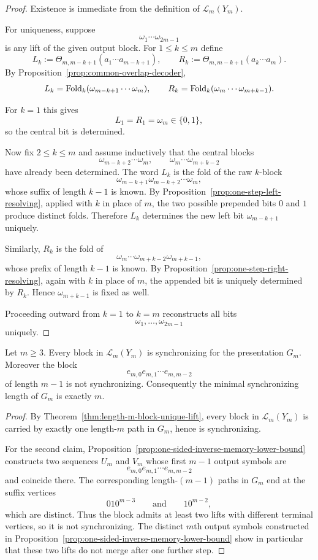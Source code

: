 \begin{proof}
Existence is immediate from the definition of $\mathcal L_m(Y_m)$.

For uniqueness, suppose
\[
\omega_1\cdots\omega_{2m-1}
\]
is any lift of the given output block.  For $1\le k\le m$ define
\[
L_k:=\Theta_{m,m-k+1}(a_1\cdots a_{m-k+1}),
\qquad
R_k:=\Theta_{m,m-k+1}(a_k\cdots a_m).
\]
By Proposition~\ref{prop:common-overlap-decoder},
\[
L_k=\operatorname{Fold}_k(\omega_{m-k+1}\cdots\omega_m),
\qquad
R_k=\operatorname{Fold}_k(\omega_m\cdots\omega_{m+k-1}).
\]

For $k=1$ this gives
\[
L_1=R_1=\omega_m\in\{0,1\},
\]
so the central bit is determined.

Now fix $2\le k\le m$ and assume inductively that the central blocks
\[
\omega_{m-k+2}\cdots\omega_m,
\qquad
\omega_m\cdots\omega_{m+k-2}
\]
have already been determined.  The word $L_k$ is the fold of the raw $k$-block
\[
\omega_{m-k+1}\omega_{m-k+2}\cdots\omega_m,
\]
whose suffix of length $k-1$ is known.  By
Proposition~\ref{prop:one-step-left-resolving}, applied with $k$ in place of
$m$, the two possible prepended bits $0$ and $1$ produce distinct folds.
Therefore $L_k$ determines the new left bit $\omega_{m-k+1}$ uniquely.

Similarly, $R_k$ is the fold of
\[
\omega_m\cdots\omega_{m+k-2}\omega_{m+k-1},
\]
whose prefix of length $k-1$ is known.  By
Proposition~\ref{prop:one-step-right-resolving}, again with $k$ in place of
$m$, the appended bit is uniquely determined by $R_k$.  Hence $\omega_{m+k-1}$
is fixed as well.

Proceeding outward from $k=1$ to $k=m$ reconstructs all bits
\[
\omega_1,\ldots,\omega_{2m-1}
\]
uniquely.
\end{proof}

\begin{corollary}
\label{cor:uniform-synchronizing-length}
Let $m\ge 3$.  Every block in $\mathcal L_m(Y_m)$ is synchronizing for the
presentation $G_m$.  Moreover the block
\[
e_{m,0}e_{m,1}\cdots e_{m,m-2}
\]
of length $m-1$ is not synchronizing.  Consequently the minimal synchronizing
length of $G_m$ is exactly $m$.
\end{corollary}

\begin{proof}
By Theorem~\ref{thm:length-m-block-unique-lift}, every block in
$\mathcal L_m(Y_m)$ is carried by exactly one length-$m$ path in $G_m$, hence
is synchronizing.

For the second claim, Proposition~\ref{prop:one-sided-inverse-memory-lower-bound}
constructs two sequences $U_m$ and $V_m$ whose first $m-1$ output symbols are
\[
e_{m,0}e_{m,1}\cdots e_{m,m-2}
\]
and coincide there.  The corresponding length-$(m-1)$ paths in $G_m$ end at the
suffix vertices
\[
010^{m-3}
\qquad\text{and}\qquad
10^{m-2},
\]
which are distinct.  Thus the block admits at least two lifts with different
terminal vertices, so it is not synchronizing.  The distinct $m$th output
symbols constructed in Proposition~\ref{prop:one-sided-inverse-memory-lower-bound}
show in particular that these two lifts do not merge after one further step.
\end{proof}

